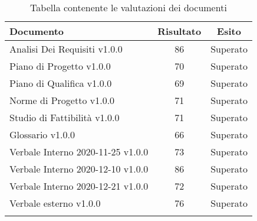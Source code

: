 \documentclass[../piano_di_qualifica.tex]{subfiles}
\begin{document}
\begin{center}
	\begin{longtable}{|l|c|c|}
		\hline
		\rowcolor{lightgray}
            \textbf{Documento} & \textbf{Risultato} &  \textbf{Esito} \\
            \hline 
            Analisi Dei Requisiti v1.0.0 & 86   & Superato \\
            \hline
            \hline 
            Piano di Progetto v1.0.0 & 70 & Superato \\
            \hline 
            Piano di Qualifica v1.0.0 & 69 & Superato \\
            \hline 
            Norme di Progetto v1.0.0 & 71 & Superato \\
            \hline 
            Studio di Fattibilità v1.0.0 & 71 & Superato \\
            \hline 
            Glossario v1.0.0 & 66 & Superato \\
            \hline 
            Verbale Interno 2020-11-25 v1.0.0 & 73 & Superato \\
            \hline 
            Verbale Interno 2020-12-10 v1.0.0 & 86 & Superato \\
            \hline 
            Verbale Interno 2020-12-21 v1.0.0 & 72 & Superato \\
            \hline 
            Verbale esterno v1.0.0 & 76 & Superato \\
            \hline
            \hline

\caption{Tabella contenente le valutazioni dei documenti}
\end{longtable}
\end{center}
\end{document}
